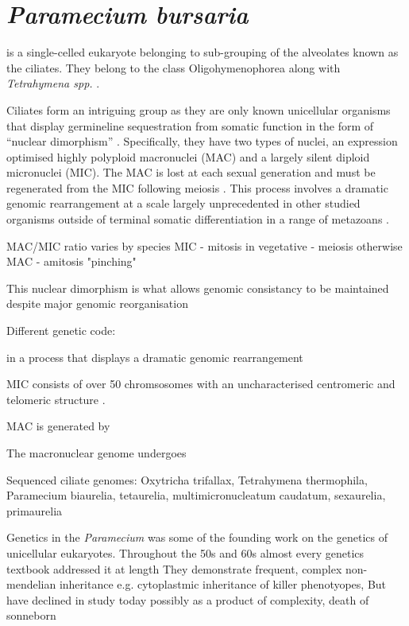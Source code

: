 \section{\textit{Paramecium bursaria}}

 is a single-celled eukaryote belonging to sub-grouping of the alveolates known
as the ciliates. They belong to the class Oligohymenophorea along with \textit{Tetrahymena spp.} \citep{Jahn2002}.

Ciliates form an intriguing group as they are only known unicellular organisms that display germineline 
sequestration from somatic function in the form of ``nuclear dimorphism'' \citep{Jahn2002}.
Specifically, they have two types of nuclei, an expression optimised highly polyploid macronuclei (MAC)
and a largely silent diploid micronuclei (MIC).  The MAC is lost at each sexual generation
and must be regenerated from the MIC following meiosis \citep{Aury2006}.
This process involves a dramatic genomic rearrangement at a scale largely unprecedented in other studied organisms
outside of terminal somatic differentiation in a range of metazoans \citep{Jahn2002}.


MAC/MIC ratio varies by species %
MIC - mitosis in vegetative - meiosis otherwise
MAC - amitosis "pinching"

This nuclear dimorphism is what allows genomic consistancy to be maintained despite major genomic reorganisation




Different genetic code:


in a process that displays
a dramatic genomic rearrangement

MIC consists of over 50 chromsosomes with an uncharacterised centromeric and telomeric structure \citep{Aury2006}.

MAC is generated by 



The macronuclear genome undergoes 




Sequenced ciliate genomes: Oxytricha trifallax, Tetrahymena thermophila, Paramecium biaurelia, tetaurelia, multimicronucleatum
caudatum, sexaurelia, primaurelia



Genetics in the \textit{Paramecium} was some of the founding work on the genetics of unicellular eukaryotes.
Throughout the 50s and 60s almost every genetics textbook addressed it at length 
They demonstrate frequent, complex non-mendelian inheritance e.g. cytoplastmic inheritance of killer phenotyopes, 
But have declined in study today possibly as a product of complexity, death of sonneborn \citep{Preer1997}





